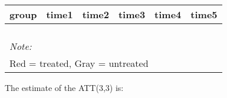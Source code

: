 \documentclass[
]{article}
\begin{document}
\begin{table}
\centering
\begin{tabular}[t]{>{}r|>{}r|>{}r|>{}r|>{}r|>{}r}
\hline
group & time1 & time2 & time3 & time4 & time5\\
\hline
\cellcolor{white}{2} & \cellcolor{white}{0.631} & \cellcolor{white}{\textcolor{black}{0.711}} & \cellcolor{white}{\textcolor{black}{0.814}} & \cellcolor{white}{0.846} & \cellcolor{white}{0.826}\\
\hline
\cellcolor{white}{3} & \cellcolor{white}{0.678} & \cellcolor{red}{\textcolor{black}{0.770}} & \cellcolor{red}{\textcolor{black}{0.664}} & \cellcolor{white}{0.800} & \cellcolor{white}{0.784}\\
\hline
\cellcolor{white}{4} & \cellcolor{white}{0.778} & \cellcolor{lightgray}{\textcolor{black}{0.807}} & \cellcolor{lightgray}{\textcolor{black}{0.673}} & \cellcolor{white}{0.750} & \cellcolor{white}{0.868}\\
\hline
\cellcolor{white}{5} & \cellcolor{white}{0.854} & \cellcolor{lightgray}{\textcolor{black}{0.939}} & \cellcolor{lightgray}{\textcolor{black}{0.854}} & \cellcolor{white}{0.800} & \cellcolor{white}{0.855}\\
\hline
\multicolumn{6}{l}{\rule{0pt}{1em}\textit{Note: }}\\
\multicolumn{6}{l}{\rule{0pt}{1em}Red = treated, Gray = untreated}\\
\end{tabular}
\end{table}

The estimate of the ATT(3,3) is:
\end{document}
